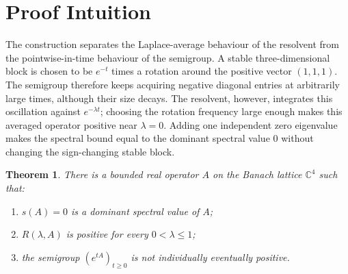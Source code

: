 \documentclass[11pt]{article}
\newtheorem{theorem}{Theorem}
\newcommand{\C}{\mathbb C}
\newcommand{\spb}{s}
\begin{document}
\section*{Proof Intuition}

The construction separates the Laplace-average behaviour of the resolvent from
the pointwise-in-time behaviour of the semigroup. A stable three-dimensional
block is chosen to be $e^{-t}$ times a rotation around the positive vector
$(1,1,1)$. The semigroup therefore keeps acquiring negative diagonal entries
at arbitrarily large times, although their size decays. The resolvent, however,
integrates this oscillation against $e^{-\lambda t}$; choosing the rotation
frequency large enough makes this averaged operator positive near $\lambda=0$.
Adding one independent zero eigenvalue makes the spectral bound equal to the
dominant spectral value $0$ without changing the sign-changing stable block.

\begin{theorem}
There is a bounded real operator $A$ on the Banach lattice $\C^4$ such that:
\begin{enumerate}
\item $\spb(A)=0$ is a dominant spectral value of $A$;
\item $R(\lambda,A)$ is positive for every $0<\lambda\leq 1$;
\item the semigroup $(e^{tA})_{t\geq 0}$ is not individually eventually
positive.
\end{enumerate}
\end{theorem}
\end{document}
